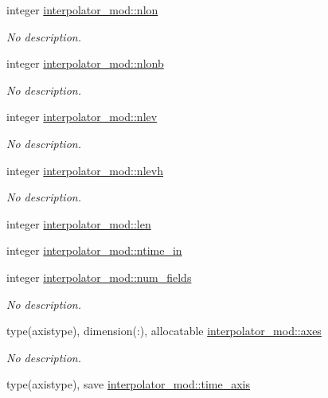 \begin{DoxyCompactItemize}
integer \hyperlink{namespaceinterpolator__mod_aafdc4f93d71e9667b386450b5fb59744}{interpolator\+\_\+mod\+::nlon}
\begin{DoxyCompactList}\small\item\em No description. \end{DoxyCompactList}\item 
integer \hyperlink{namespaceinterpolator__mod_a312469d5e5202ee51d387b17734558c8}{interpolator\+\_\+mod\+::nlonb}
\begin{DoxyCompactList}\small\item\em No description. \end{DoxyCompactList}\item 
integer \hyperlink{namespaceinterpolator__mod_a6037a0a4085094164b9a85965c842487}{interpolator\+\_\+mod\+::nlev}
\begin{DoxyCompactList}\small\item\em No description. \end{DoxyCompactList}\item 
integer \hyperlink{namespaceinterpolator__mod_a5549db03f23ee2af91ba95d80f0d6599}{interpolator\+\_\+mod\+::nlevh}
\begin{DoxyCompactList}\small\item\em No description. \end{DoxyCompactList}\item 
integer \hyperlink{namespaceinterpolator__mod_a6bd2ec3395203e1b6aba0610bfbfe16b}{interpolator\+\_\+mod\+::len}
\item 
integer \hyperlink{namespaceinterpolator__mod_abaac223c7892bb4d462ab19a4bceb560}{interpolator\+\_\+mod\+::ntime\+\_\+in}
\item 
integer \hyperlink{namespaceinterpolator__mod_a1c104400d854c0e697b5c45acd77a142}{interpolator\+\_\+mod\+::num\+\_\+fields}
\begin{DoxyCompactList}\small\item\em No description. \end{DoxyCompactList}\item 
type(axistype), dimension(\+:), allocatable \hyperlink{namespaceinterpolator__mod_aff9153472fc8b4a3382cba78b8c2dc19}{interpolator\+\_\+mod\+::axes}
\begin{DoxyCompactList}\small\item\em No description. \end{DoxyCompactList}\item 
type(axistype), save \hyperlink{namespaceinterpolator__mod_a2b93f7d5634aaa2389326983a7f4833f}{interpolator\+\_\+mod\+::time\+\_\+axis}

\end{DoxyCompactItemize}
